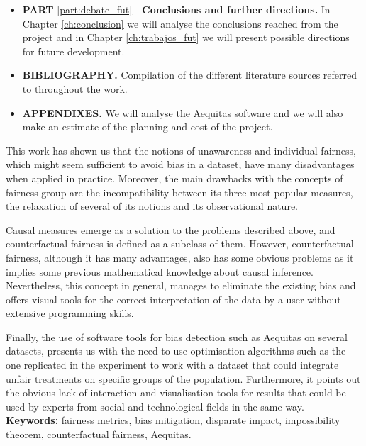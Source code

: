 \begin{itemize}
    \item \textbf{PART} \ref{part:debate_fut} - \textbf{Conclusions and further directions.} In Chapter \ref{ch:conclusion} we will analyse the conclusions reached from the project and in Chapter \ref{ch:trabajos_fut} we will present possible directions for future development. \vspace{3mm}
    \item \textbf{BIBLIOGRAPHY.} Compilation of the different literature sources referred to throughout the work. \vspace{3mm}
    \item \textbf{APPENDIXES.} We will analyse the Aequitas software and we will also make an estimate of the planning and cost of the project. \vspace{3mm}
\end{itemize}

This work has shown us that the notions of unawareness and individual fairness, which might seem sufficient to avoid bias in a dataset, have many disadvantages when applied in practice. Moreover, the main drawbacks with the concepts of fairness group are the incompatibility between its three most popular measures, the relaxation of several of its notions and its observational nature.

Causal measures emerge as a solution to the problems described above, and counterfactual fairness is defined as a subclass of them. However, counterfactual fairness, although it has many advantages, also has some obvious problems as it implies some previous mathematical knowledge about causal inference. Nevertheless, this concept in general, manages to eliminate the existing bias and offers visual tools for the correct interpretation of the data by a user without extensive programming skills.

Finally, the use of software tools for bias detection such as Aequitas on several datasets, presents us with the need to use optimisation algorithms such as the one replicated in the experiment to work with a dataset that could integrate unfair treatments on specific groups of the population. Furthermore, it points out the obvious lack of interaction and visualisation tools for results that could be used by experts from social and technological fields in the same way.\\

\textbf{Keywords:} fairness metrics, bias mitigation, disparate impact,  impossibility theorem, counterfactual fairness, Aequitas.
